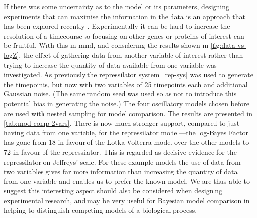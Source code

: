 If there was some uncertainty as to the model or its parameters, designing experiments that can maximise the information in the data is an approach that has been explored recently~\cite{liepe2013}.
Experimentally it can be hard to increase the resolution of a timecourse so focusing on other genes or proteins of interest can be fruitful. 
With this in mind, and considering the results shown in \autoref{fig:data-vs-logZ}, the effect of gathering data from another variable of interest rather than trying to increase the quantity of data available from one variable was investigated.
As previously the repressilator system~\autoref{rep-sys} was used to generate the timepoints, but now with two variables of 25 timepoints each and additional Gaussian noise.
(The same random seed was used so as not to introduce this potential bias in generating the noise.)
The four oscillatory models chosen before are used with nested sampling for model comparison.
The results are presented in \autoref{tab:mod-comp-2vars}.
There is now much stronger support, compared to just having data from one variable, for the repressilator model---the log-Bayes Factor has gone from 18 in favour of the Lotka-Volterra model over the other models to 72 in favour of the repressilator.
This is regarded as decisive evidence for the repressilator on Jeffreys' scale.
For these example models the use of data from two variables gives far more information than increasing the quantity of data from one variable and enables us to prefer the known model.
We are thus able to suggest this interesting aspect should also be considered when designing experimental research, and may be very useful for Bayesian model comparison in helping to distinguish competing models of a biological process.

